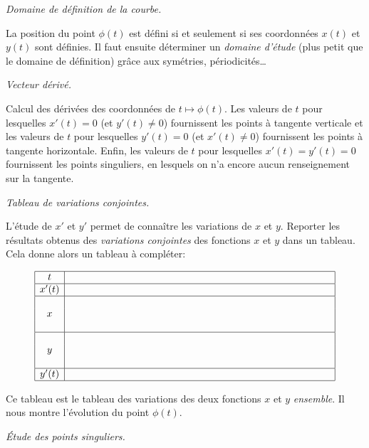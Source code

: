 \begin{description}
\item \emph{Domaine de définition de la courbe.}

La position du point $\phi(t)$ est défini si et seulement si ses coordonnées $x(t)$ et $y(t)$ sont définies.
Il faut ensuite déterminer un \emph{domaine d'étude} (plus petit que le domaine de définition) 
grâce aux symétries, périodicités\ldots 

\item \emph{Vecteur dérivé.} 

Calcul des dérivées des coordonnées de $t\mapsto \phi(t)$.
Les valeurs de $t$ pour lesquelles $x'(t)=0$ (et $y'(t)\neq0$) 
fournissent les points à tangente verticale et les valeurs de 
$t$ pour lesquelles $y'(t)=0$ (et $x'(t)\neq0$) fournissent les 
points à tangente horizontale. Enfin, les valeurs de $t$ pour 
lesquelles $x'(t)=y'(t)=0$ fournissent les points singuliers, 
en lesquels on n'a encore aucun renseignement sur la tangente.


\item \emph{Tableau de variations conjointes.} 

L'étude de $x'$ et $y'$ permet de connaître les variations de $x$ et $y$.
Reporter les résultats obtenus des \emph{variations conjointes} des fonctions $x$ et $y$
dans un tableau. Cela donne alors un tableau à compléter:

$$\begin{array}{|c|ccccc|}
\hline
t&\qquad&\qquad&\qquad&\qquad&\qquad\\
\hline
x'(t)& & & & &\rule{5cm}{0cm}\\
\hline
 & & & & & \\
x& & & & & \\
 & & & & & \\
\hline
 & & & & & \\
y& & & & & \\
 & & & & & \\
\hline
y'(t)& & & & & \\
\hline
\end{array}
$$

Ce tableau est le tableau des variations des
deux fonctions $x$ et $y$ \emph{ensemble}. Il nous montre 
l'évolution du point $\phi(t)$. 


\item \emph{\'Etude des points singuliers.} 


\end{description}
